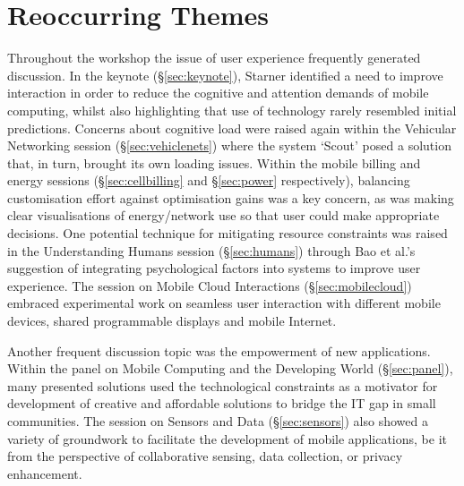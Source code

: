 \section{Reoccurring Themes}
\label{sec:keythemes}

Throughout the workshop the issue of user experience frequently generated 
discussion. In the keynote (\S\ref{sec:keynote}), Starner identified a need 
to improve interaction in order to reduce the cognitive and attention demands of 
mobile computing, whilst also highlighting that use of technology 
rarely resembled initial 
predictions. Concerns about cognitive load were raised again within the Vehicular 
Networking session (\S\ref{sec:vehiclenets}) where the system `Scout' posed 
a solution that, in turn, brought its own loading issues. Within the mobile 
billing and energy sessions (\S\ref{sec:cellbilling} and \S\ref{sec:power} 
respectively), balancing customisation effort against optimisation gains was a 
key concern, as was making clear visualisations of energy\slash network
use so that user could make appropriate decisions. One potential technique for 
mitigating resource constraints was raised in the Understanding Humans session 
(\S\ref{sec:humans}) through Bao et al.'s suggestion of integrating
psychological factors into systems to improve user experience. The
session on Mobile Cloud Interactions (\S\ref{sec:mobilecloud}) embraced
experimental work on seamless user interaction with different mobile
devices, shared programmable displays and mobile Internet.

Another frequent discussion topic was the empowerment of new
applications. Within the panel on Mobile Computing and the Developing
World (\S\ref{sec:panel}), many presented solutions used the
technological constraints as a motivator for development of creative and
affordable solutions to bridge the IT gap in small communities. The
session on Sensors and Data (\S\ref{sec:sensors}) also showed a variety
of groundwork to facilitate the development of mobile applications,
be it from the perspective of collaborative sensing, data collection,
or privacy enhancement.

